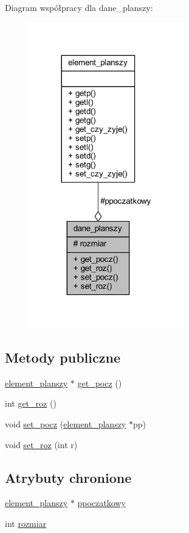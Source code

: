 Diagram współpracy dla dane\+\_\+planszy\+:
\nopagebreak
\begin{figure}[H]
\begin{center}
\leavevmode
\includegraphics[width=191pt]{classdane__planszy__coll__graph}
\end{center}
\end{figure}
\subsection*{Metody publiczne}
\begin{DoxyCompactItemize}
\item 
\mbox{\hyperlink{classelement__planszy}{element\+\_\+planszy}} $\ast$ \mbox{\hyperlink{classdane__planszy_a1b6f7b4b0a06da4407bea609c48441ce}{get\+\_\+pocz}} ()
\item 
int \mbox{\hyperlink{classdane__planszy_a67238befe224aca22577d787df2dffa9}{get\+\_\+roz}} ()
\item 
void \mbox{\hyperlink{classdane__planszy_abd328051f43a94315eccb2a80fcb4593}{set\+\_\+pocz}} (\mbox{\hyperlink{classelement__planszy}{element\+\_\+planszy}} $\ast$pp)
\item 
void \mbox{\hyperlink{classdane__planszy_a9516490206327f9bd83eeffc6c8180bb}{set\+\_\+roz}} (int r)
\end{DoxyCompactItemize}
\subsection*{Atrybuty chronione}
\begin{DoxyCompactItemize}
\item 
\mbox{\hyperlink{classelement__planszy}{element\+\_\+planszy}} $\ast$ \mbox{\hyperlink{classdane__planszy_abf638c9ebf42b2b56c093f427310d7a5}{ppoczatkowy}}
\item 
int \mbox{\hyperlink{classdane__planszy_a529f943e243c16c773e0753ffa945223}{rozmiar}}
\end{DoxyCompactItemize}


